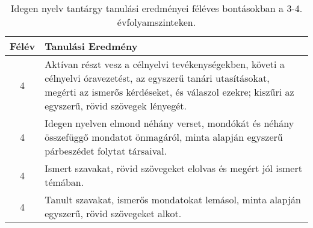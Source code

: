        
           \begin{longtable}{c | p{12cm} }
            \caption[Idegen nyelv 3-4.]{Idegen nyelv tantárgy tanulási eredményei féléves bontásokban a 3-4. évfolyamszinteken. }  \\

            \textbf{Félév} & \textbf{Tanulási Eredmény} \\
            \hline
            \endhead
                                
                                          4 &  Aktívan részt vesz a célnyelvi tevékenységekben, követi a célnyelvi óravezetést, az egyszerű tanári utasításokat, megérti az ismerős kérdéseket, és válaszol ezekre; kiszűri az egyszerű, rövid szövegek lényegét. \\ \hline
                                          4 &  Idegen nyelven elmond néhány verset, mondókát és néhány összefüggő mondatot önmagáról, minta alapján egyszerű párbeszédet folytat társaival. \\ \hline
                                          4 &  Ismert szavakat, rövid szövegeket elolvas és megért jól ismert témában. \\ \hline
                                          4 &  Tanult szavakat, ismerős mondatokat lemásol, minta alapján egyszerű, rövid szövegeket alkot. \\ \hline
                                      
                        \end{longtable}
            \clearpage


